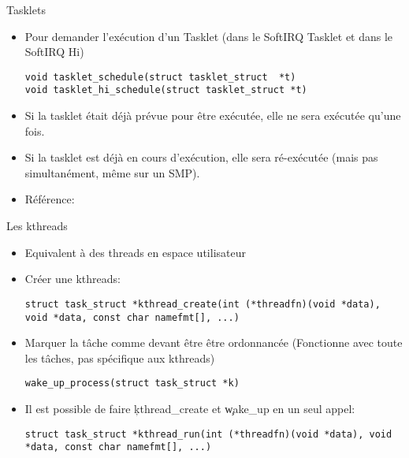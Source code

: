 \begin{frame}[fragile=singleslide]{Tasklets}
  \begin{itemize}
  \item  Pour  demander  l'exécution  d'un Tasklet  (dans  le  SoftIRQ
    Tasklet et dans le SoftIRQ Hi)
    \begin{lstlisting}
void tasklet_schedule(struct tasklet_struct  *t)
void tasklet_hi_schedule(struct tasklet_struct *t)
    \end{lstlisting}
  \item Si  la tasklet était déjà  prévue pour être  exécutée, elle ne
    sera exécutée qu'une fois.
  \item  Si  la tasklet  est  déjà  en  cours d'exécution,  elle  sera
    ré-exécutée (mais pas simultanément, même sur un SMP).
  \item Référence: 
  \end{itemize}
\end{frame}

\begin{frame}[fragile=singleslide]{Les kthreads}
  \begin{itemize}
  \item Equivalent à des threads en espace utilisateur
  \item Créer une kthreads:
    \begin{lstlisting}
struct task_struct *kthread_create(int (*threadfn)(void *data), void *data, const char namefmt[], ...)
    \end{lstlisting}
  \item  Marquer   la  tâche   comme  devant  être   être  ordonnancée
    (Fonctionne avec toute les tâches, pas spécifique aux kthreads)
    \begin{lstlisting}
wake_up_process(struct task_struct *k)
    \end{lstlisting}
  \item Il est possible de faire \c{kthread_create} et \c{wake_up} en
    un seul appel:
    \begin{lstlisting}
struct task_struct *kthread_run(int (*threadfn)(void *data), void *data, const char namefmt[], ...)
    \end{lstlisting}
  \end{itemize}
\end{frame}

